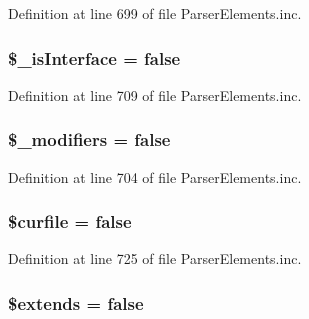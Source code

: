 \-Definition at line 699 of file \-Parser\-Elements.\-inc.

\hypertarget{classparser_class_a04c668274af191905df7d5a01721cd07}{
\subsubsection[{\$\-\_\-is\-Interface}]{\setlength{\rightskip}{0pt plus 5cm}\$\-\_\-is\-Interface = false}}\label{classparser_class_a04c668274af191905df7d5a01721cd07}


\-Definition at line 709 of file \-Parser\-Elements.\-inc.

\hypertarget{classparser_class_aa01f7445669441074fc2d6ccd08eb4a1}{
\subsubsection[{\$\-\_\-modifiers}]{\setlength{\rightskip}{0pt plus 5cm}\$\-\_\-modifiers = false}}\label{classparser_class_aa01f7445669441074fc2d6ccd08eb4a1}


\-Definition at line 704 of file \-Parser\-Elements.\-inc.

\hypertarget{classparser_class_a84352b4d740a45279b61228864b9b5e7}{
\subsubsection[{\$curfile}]{\setlength{\rightskip}{0pt plus 5cm}\$curfile = false}}\label{classparser_class_a84352b4d740a45279b61228864b9b5e7}


\-Definition at line 725 of file \-Parser\-Elements.\-inc.

\hypertarget{classparser_class_afc0e87808a6f40ccf687fbbc823b0ebd}{
\subsubsection[{\$extends}]{\setlength{\rightskip}{0pt plus 5cm}\$extends = false}}\label{classparser_class_afc0e87808a6f40ccf687fbbc823b0ebd}


